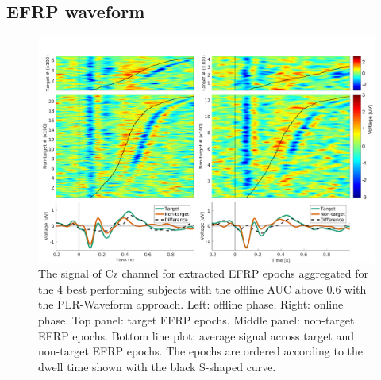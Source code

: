 \documentclass[12pt]{iopart}
\begin{document}
\subsection{EFRP waveform}
\begin{figure}[!t]
\center
    \includegraphics[trim={0cm 0cm 0cm 0cm},clip,height=0.65\columnwidth]{../images/Epochs_GA_chCz_ALL.pdf}%
    \caption{The signal of Cz channel for extracted EFRP epochs aggregated
        for the 4 best performing subjects with the offline AUC above 0.6 with the PLR-Waveform approach.
        Left: offline phase. Right: online phase.
        Top panel: target EFRP epochs. Middle panel: non-target EFRP epochs.
        Bottom line plot: average signal across target and non-target EFRP epochs.
        The epochs are ordered according to the dwell time
        shown with the black S-shaped curve.
    }
\label{fig:epochsCz}
\end{figure}
\end{document}
